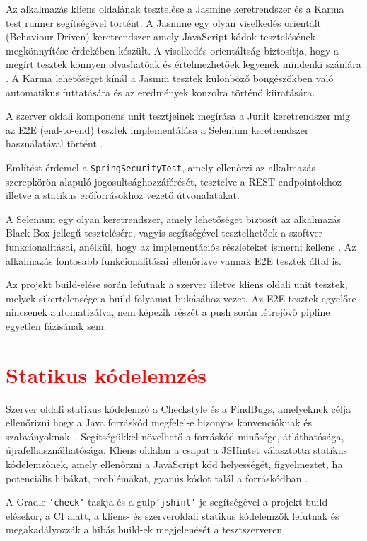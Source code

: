 Az alkalmazás kliens oldalának tesztelése a Jasmine keretrendszer és a Karma test runner segítségével történt. A Jasmine egy olyan viselkedés orientált (Behaviour Driven) keretrendszer amely JavaScript kódok tesztelésének megkönnyítése érdekében készült. A viselkedés orientáltság biztosítja, hogy a megírt tesztek könnyen olvashatóak és értelmezhetőek legyenek mindenki számára \cite{Jasmine}. A Karma lehetőséget kínál a Jasmin tesztek különböző böngészőkben való automatikus futtatására és az eredmények konzolra történő kiiratására\cite{KarmaJasmine}.

A szerver oldali komponens unit tesztjeinek megírása a Junit keretrendszer míg az E2E (end-to-end) tesztek implementálása a Selenium keretrendszer használatával történt \cite{Selenium}.  

Említést érdemel a \texttt{SpringSecurityTest}, amely ellenőrzi az alkalmazás szerepkörön alapuló jogosultsághozzáférését, tesztelve a REST endpointokhoz illetve a statikus erőforrásokhoz vezető útvonalatakat. 

A Selenium egy olyan keretrendszer, amely lehetőséget biztosít az alkalmazás Black Box jellegű tesztelésére, vagyis segítségével tesztelhetőek a szoftver funkcionalitásai, anélkül, hogy az implementációs részleteket ismerni kellene \cite{Selenium}. Az alkalmazás fontosabb funkcionalitásai ellenőrizve vannak E2E tesztek által is.

Az projekt build-elése során lefutnak a szerver illetve kliens oldali unit tesztek, melyek sikertelensége a build folyamat bukásához vezet. Az E2E tesztek egyelőre nincsenek automatizálva, nem képezik részét a push során létrejövő pipline egyetlen fázisának sem. 


\section{\textcolor{red}{Statikus kódelemzés}}
\label{subsec:statikusKodElemzes}

Szerver oldali statikus kódelemző a Checkstyle és a FindBugs, amelyeknek célja ellenőrizni hogy a Java forráskód megfelel-e bizonyos konvencióknak és szabványoknak~\cite{Checkstyle, FindBugs}. Segítségükkel növelhető a forráskód minősége, átláthatósága, újrafelhasználhatósága. 
Kliens oldalon a csapat a JSHintet választotta statikus kódelemzőnek, amely  ellenőrzni a JavaScript kód helyességét, figyelmeztet, ha potenciális hibákat, problémákat, gyanús kódot talál a forráskódban \cite{JSHint}.

A Gradle \texttt{'check'} taskja és a gulp\texttt{'jshint'}-je segítségével a projekt build-elésekor, a CI alatt, a kliens- és szerveroldali statikus kódelemzők lefutnak és megakadályozzák a hibás build-ek megjelenését a tesztszerveren. 


